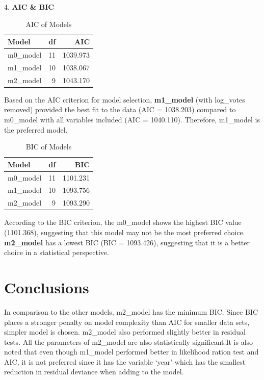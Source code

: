 \documentclass[
  letterpaper,
  DIV=11,
  numbers=noendperiod]{scrartcl}
\begin{document}
4. \textbf{AIC \& BIC}

\hypertarget{tbl-AIC}{}
\begin{longtable}{lrr}
\caption{\label{tbl-AIC}AIC of Models }\tabularnewline

\toprule
Model & df & AIC \\ 
\midrule\addlinespace[2.5pt]
m0\_model & 11 & 1039.973 \\ 
m1\_model & 10 & 1038.067 \\ 
m2\_model & 9 & 1043.170 \\ 
\bottomrule
\end{longtable}

Based on the AIC criterion for model selection, \textbf{m1\_model} (with
log\_votes removed) provided the best fit to the data (AIC = 1038.203)
compared to m0\_model with all variables included (AIC = 1040.110).
Therefore, m1\_model is the preferred model.

\hypertarget{tbl-BIC}{}
\begin{longtable}{lrr}
\caption{\label{tbl-BIC}BIC of Models }\tabularnewline

\toprule
Model & df & BIC \\ 
\midrule\addlinespace[2.5pt]
m0\_model & 11 & 1101.231 \\ 
m1\_model & 10 & 1093.756 \\ 
m2\_model & 9 & 1093.290 \\ 
\bottomrule
\end{longtable}

According to the BIC criterion, the m0\_model shows the highest BIC
value (1101.368), suggesting that this model may not be the most
preferred choice. \textbf{m2\_model} has a lowest BIC (BIC = 1093.426),
suggesting that it is a better choice in a statistical perspective.

\hypertarget{sec-Conc}{%
\section{Conclusions}\label{sec-Conc}}

In comparison to the other models, m2\_model has the minimum BIC. Since
BIC places a stronger penalty on model complexity than AIC for smaller
data sets, simpler model is chosen. m2\_model also performed slightly
better in residual tests. All the parameters of m2\_model are also
statistically significant.It is also noted that even though m1\_model
performed better in likelihood ration test and AIC, it is not preferred
since it has the variable `year' which has the smallest reduction in
residual deviance when adding to the model.
\end{document}
